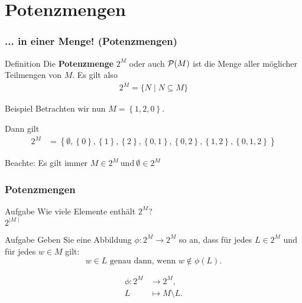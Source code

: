 \section{Potenzmengen}
\begin{frame}
	\frametitle{... in einer Menge! (Potenzmengen)}
	\begin{block}{Definition}
		Die \textbf{Potenzmenge} $2^M$ oder auch $\mathcal{P} (M)$ ist die Menge aller möglicher Teilmengen von $M$. Es gilt also 
		\begin{align*}
			2^M = \{N \mid N \subseteq M\}
		\end{align*}
	\end{block}
	\pause
	
	\begin{block}{Beispiel}
		Betrachten wir nun   $M = \left\{ 1,2,0 \right\} $. \\ \pause
		
		Dann gilt 
		\begin{align*}
		2^M &= \left\{ \emptyset, \left\{ 0 \right\}, \left\{ 1 \right\}, \left\{ 2 \right\}, \left\{ 0,1 \right\} , \left\{ 0,2 \right\}, \left\{ 1,2 \right\}, \left\{ 0,1,2 \right\} \right\}
		\end{align*}
		
		Beachte: Es gilt immer $M \in 2^M \ \text{und} \ \emptyset \in 2^M$
	\end{block}
	
\end{frame}

\begin{frame}
	\frametitle{Potenzmengen}
	\begin{block}{Aufgabe}
		Wie viele Elemente enthält $2^M$? \\[0.5em]
		
		\pause
		$2^{\mid M \mid }$
	\end{block}
	
	\pause
	\begin{block}{Aufgabe}
		Geben Sie eine Abbildung $\phi \colon 2^{M} \longrightarrow 2^{M}$ so an,
		dass für jedes $L \in 2^{M}$ und für jedes $w \in M$ gilt:
		\begin{equation*}
			w \in L \text{ genau dann, wenn } w \notin \phi(L).
		\end{equation*}
		
		\pause
		\begin{align*}
			\phi \colon 2^{M} &\longrightarrow 2^{M},\\
			L &\mapsto M \setminus L.
		\end{align*}
	\end{block}

\end{frame}


